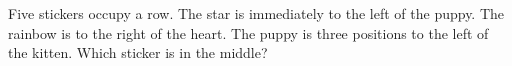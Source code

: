 Five stickers occupy a row. The star is immediately to the left of the puppy. The rainbow is to the right of the heart. The puppy is three positions to the left of the kitten. Which sticker is in the middle?
